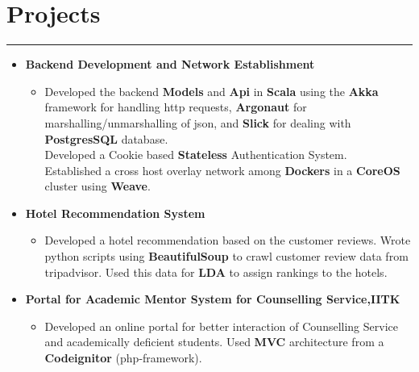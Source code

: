 \documentclass[a4paper]{article}
\begin{document}
\section*{Projects}
\hrule
\vspace{2mm}
  \begin{itemize}
  \item
   \textbf{Backend Development and Network Establishment}
  \begin{itemize}
          \textit{under Prof. Manindra Agarwal}
      \item Developed the backend \textbf{Models} and \textbf{Api} in \textbf{Scala} using the \textbf{Akka} framework
          for handling http requests, \textbf{Argonaut} for marshalling/unmarshalling of json,
          and \textbf{Slick} for dealing with \textbf{PostgresSQL} database.\\
          Developed a Cookie based \textbf{Stateless} Authentication System.\\
          Established a cross host overlay network among \textbf{Dockers} in a \textbf{CoreOS}
           cluster using \textbf{Weave}.
    \end{itemize}
   \item 
    \textbf{Hotel Recommendation System}
	   \begin{itemize}
	    \item Developed a hotel recommendation based on the customer reviews.
            Wrote python scripts using \textbf{BeautifulSoup} to crawl customer review data from tripadvisor.
            Used this data for \textbf{LDA} to assign rankings to the hotels.
	   \end{itemize}
    \item
    \textbf{Portal for Academic Mentor System for Counselling Service,IITK}
	   \begin{itemize}
	    \item Developed an online portal for better interaction of Counselling 
            Service and academically deficient students. Used \textbf{MVC} architecture 
            from a \textbf{Codeignitor} (php-framework).
	   \end{itemize}
  \end{itemize}

\end{document}

